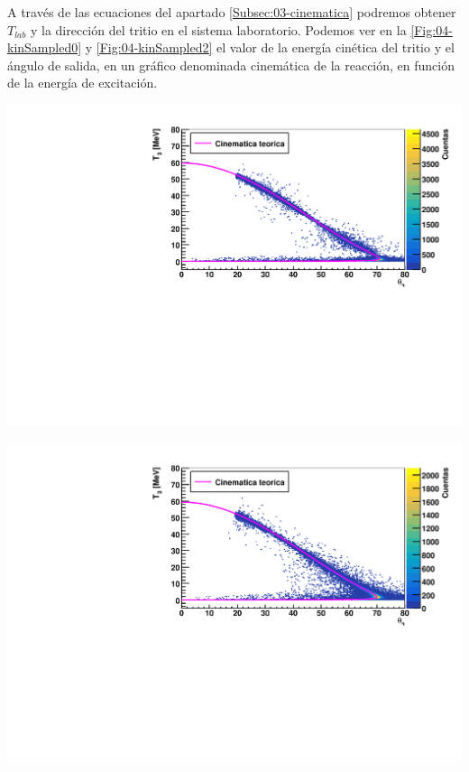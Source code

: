 \begin{enumerate}
    
    A través de las ecuaciones del apartado \ref{Subsec:03-cinematica} podremos obtener $T_{lab}$ y la dirección del tritio en el sistema laboratorio. Podemos ver en la \cref{Fig:04-kinSampled0} y \cref{Fig:04-kinSampled2} el valor de la energía cinética del tritio y el ángulo de salida, en un gráfico denominada cinemática de la reacción, en función de la energía de excitación.
    
    \begin{minipage}{0.49\linewidth} \centering
        \includegraphics[width=1\linewidth]{Imagenes/Kinematics/KinSampled_Ex0.00_incIdx0.pdf} 

        \label{Fig:04-kinSampled0}
    \end{minipage} \hfill
    \begin{minipage}{0.49\linewidth}
        \includegraphics[width=1\linewidth]{Imagenes/Kinematics/KinSampled_Ex0.20_incIdx0.pdf}


\end{minipage}
\end{enumerate}
